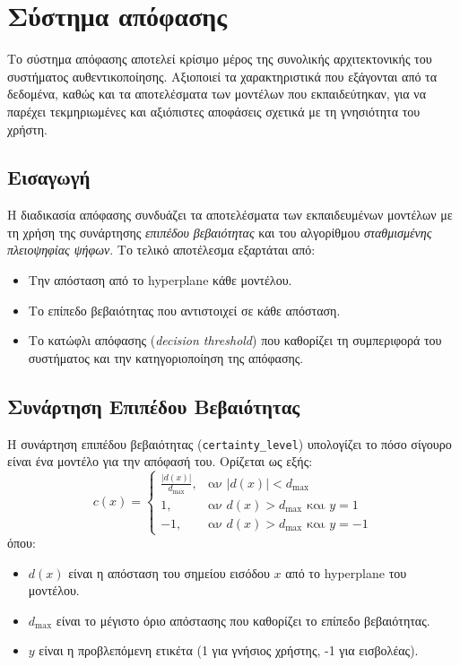 \section{Σύστημα απόφασης}
\label{sec:implementation_decision}

Το σύστημα απόφασης αποτελεί κρίσιμο μέρος της συνολικής αρχιτεκτονικής του συστήματος αυθεντικοποίησης. Αξιοποιεί τα χαρακτηριστικά που εξάγονται από τα δεδομένα, καθώς και τα αποτελέσματα των μοντέλων που εκπαιδεύτηκαν, για να παρέχει τεκμηριωμένες και αξιόπιστες αποφάσεις σχετικά με τη γνησιότητα του χρήστη.

\subsection{Εισαγωγή}
Η διαδικασία απόφασης συνδυάζει τα αποτελέσματα των εκπαιδευμένων μοντέλων με τη χρήση της συνάρτησης \emph{επιπέδου βεβαιότητας} και του αλγορίθμου \emph{σταθμισμένης πλειοψηφίας ψήφων}. Το τελικό αποτέλεσμα εξαρτάται από:
\begin{itemize}
    \item Την απόσταση από το hyperplane κάθε μοντέλου.
    \item Το επίπεδο βεβαιότητας που αντιστοιχεί σε κάθε απόσταση.
    \item Το κατώφλι απόφασης (\emph{decision threshold}) που καθορίζει τη συμπεριφορά του συστήματος και την κατηγοριοποίηση της απόφασης.
\end{itemize}

\subsection{Συνάρτηση Επιπέδου Βεβαιότητας}
Η συνάρτηση επιπέδου βεβαιότητας (\texttt{certainty\_level}) υπολογίζει το πόσο σίγουρο είναι ένα μοντέλο για την απόφασή του. Ορίζεται ως εξής:
\begin{equation}
    c(x) =
    \begin{cases} 
    \frac{|d(x)|}{d_{\text{max}}}, & \text{αν } |d(x)| < d_{\text{max}} \\
    1, & \text{αν } d(x) > d_{\text{max}} \text{ και } y = 1 \\
    -1, & \text{αν } d(x) > d_{\text{max}} \text{ και } y = -1
    \label{eq:certaintyLevel}
    \end{cases}
\end{equation}
όπου:
\begin{itemize}
    \item $d(x)$ είναι η απόσταση του σημείου εισόδου $x$ από το hyperplane του μοντέλου.
    \item $d_{\text{max}}$ είναι το μέγιστο όριο απόστασης που καθορίζει το επίπεδο βεβαιότητας.
    \item $y$ είναι η προβλεπόμενη ετικέτα (1 για γνήσιος χρήστης, -1 για εισβολέας).
\end{itemize}

